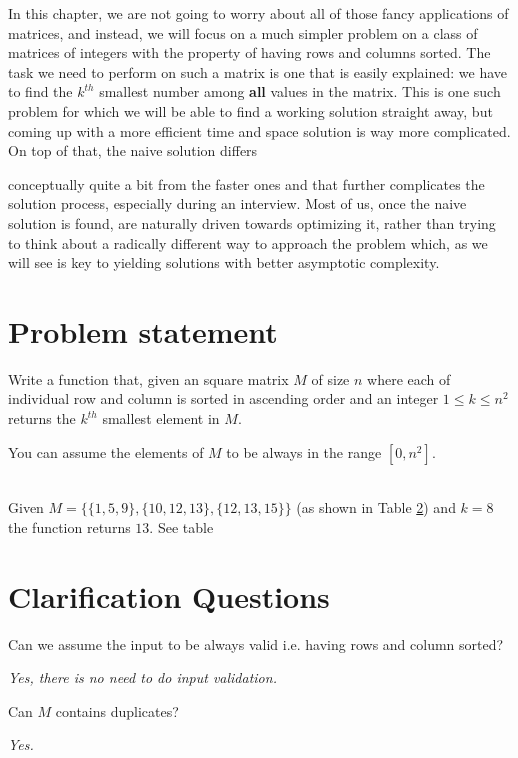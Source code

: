 In this chapter, we are not going to worry about all of those fancy applications of matrices, and instead, we will focus on a much simpler problem on a class of matrices of integers with the property of having rows and columns sorted. The task we need to perform on such a matrix is one that is easily explained: we have to find the $k^{th}$ smallest number among \textbf{all} values in the matrix.
This is one such problem for which we will be able to find a working solution straight away, but coming up with a more efficient time and space solution is way more complicated. 
On top of that, the naive solution differs 

conceptually quite a bit from the faster ones and that further complicates the solution process, especially during an interview. Most of us, once the naive solution is found, are naturally driven towards optimizing it, rather than trying to think about a radically different way to approach the problem which, as we will see is key to yielding solutions with better asymptotic complexity.



\section{Problem statement}
\begin{exercise}
\label{example:kth_smallest_in_sorted_matrix:exercice1}
Write a function that, given an square matrix $M$ of size $n$  where each of individual row and column is sorted in ascending order and an integer $1 \leq k \leq n^2$
returns the $k^{th}$ smallest element in $M$.


You can assume the elements of $M$ to be always in the range $[0,n^2]$.

    \begin{example}
        \label{example:kth_smallest_in_sorted_matrix:example1}
        \hfill \\
        Given $M=\{\{1,5,9\},\{10,12,13\},\{12,13,15\}\}$ (as shown in Table \ref{}) and $k=8$ the function returns $13$. See table
    \end{example}
\end{exercise}




\section{Clarification Questions}

\begin{QandA}
    \item Can we assume the input to be always valid i.e. having rows and column sorted?
    \begin{answered}
        \textit{Yes, there is no need to do input validation.}
    \end{answered}
    
    \item Can $M$ contains duplicates?
    \begin{answered}
        \textit{Yes.}
    \end{answered}
    
\end{QandA}

